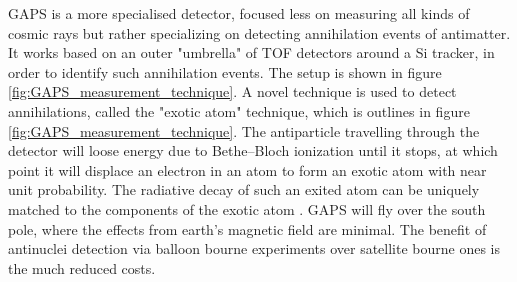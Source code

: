GAPS is a more specialised detector, focused less on measuring all kinds of cosmic rays but rather specializing on detecting annihilation events of antimatter. It works based on an outer "umbrella" of TOF detectors around a Si tracker, in order to identify such annihilation events. The setup is shown in figure \ref{fig:GAPS_measurement_technique}. A novel technique is used to detect annihilations, called the "exotic atom" technique, which is outlines in figure \ref{fig:GAPS_measurement_technique}. The antiparticle travelling through the detector will loose energy due to Bethe--Bloch ionization until it stops, at which point it will displace an electron in an atom to form an exotic atom with near unit probability. The radiative decay of such an exited atom can be uniquely matched to the components of the exotic atom \cite{GAPS_setup_Bird}. GAPS will fly over the south pole, where the effects from earth's magnetic field are minimal. The benefit of antinuclei detection via balloon bourne experiments over satellite bourne ones is the much reduced costs.\\

